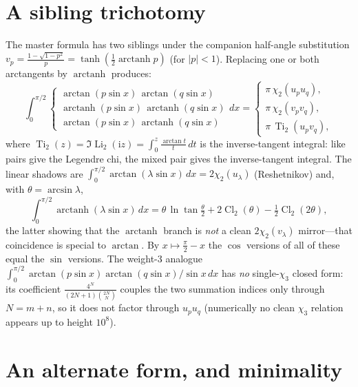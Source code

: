 \documentclass[11pt]{article}
\DeclareMathOperator{\Li}{Li}
\DeclareMathOperator{\Ti}{Ti}
\DeclareMathOperator{\Cl}{Cl}
\DeclareMathOperator{\arctanh}{arctanh}
\newcommand{\chitwo}{\chi_{2}}
\newcommand{\up}{u_{p}}
\newcommand{\uq}{u_{q}}
\newcommand{\vp}{v_{p}}
\newcommand{\vq}{v_{q}}
\theoremstyle{plain}\newtheorem{theorem}{Theorem}\newtheorem{proposition}[theorem]{Proposition}
\theoremstyle{remark}\newtheorem{remark}[theorem]{Remark}
\begin{document}
\section{A sibling trichotomy}
The master formula has two siblings under the companion half-angle substitution
$\vp=\frac{1-\sqrt{1-p^2}}{p}=\tanh(\tfrac12\arctanh p)$ (for $|p|<1$). Replacing one or both
arctangents by $\arctanh$ produces:
\begin{equation}\label{eq:trich}
  \int_0^{\pi/2}\!\!\begin{cases}\arctan(p\sin x)\,\arctan(q\sin x)\\[2pt]
  \arctanh(p\sin x)\,\arctanh(q\sin x)\\[2pt]
  \arctan(p\sin x)\,\arctanh(q\sin x)\end{cases}\!\!dx=
  \begin{cases}\pi\,\chitwo(\up\uq),\\[2pt]\pi\,\chitwo(\vp\vq),\\[2pt]\pi\,\Ti_2(\up\vq),\end{cases}
\end{equation}
where $\Ti_2(z)=\Im\Li_2(\mathrm iz)=\int_0^z\frac{\arctan t}{t}\,dt$ is the inverse-tangent integral: like
pairs give the Legendre chi, the mixed pair gives the inverse-tangent integral. The linear shadows are
$\int_0^{\pi/2}\arctan(\lambda\sin x)\,dx=2\chitwo(u_\lambda)$ (Reshetnikov) and, with $\theta=\arcsin\lambda$,
\begin{equation}\label{eq:lintanh}
  \int_0^{\pi/2}\arctanh(\lambda\sin x)\,dx=\theta\,\ln\tan\tfrac\theta2+2\Cl_2(\theta)-\tfrac12\Cl_2(2\theta),
\end{equation}
the latter showing that the $\arctanh$ branch is \emph{not} a clean $2\chitwo(v_\lambda)$ mirror---that
coincidence is special to $\arctan$. By $x\mapsto\frac\pi2-x$ the $\cos$ versions of all of these equal the
$\sin$ versions. The weight-$3$ analogue $\int_0^{\pi/2}\arctan(p\sin x)\arctan(q\sin x)/\sin x\,dx$ has
\emph{no} single-$\chi_3$ closed form: its coefficient $\frac{4^N}{(2N+1)\binom{2N}{N}}$ couples the two
summation indices only through $N=m+n$, so it does not factor through $\up\uq$ (numerically no clean
$\chi_3$ relation appears up to height $10^8$).

\section{An alternate form, and minimality}\label{sec:minimal}
\end{document}
